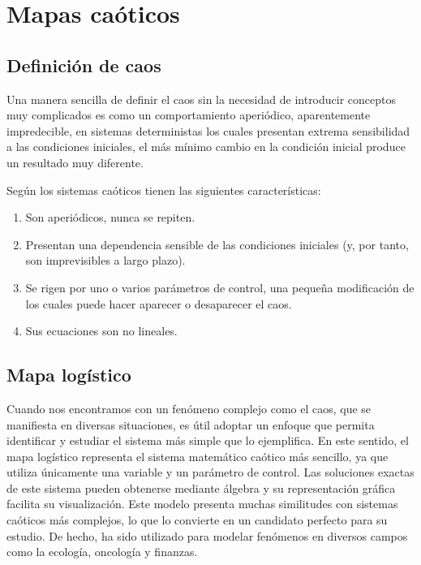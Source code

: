 \chapter{Mapas caóticos}

    \section{Definición de caos}
    
    Una manera sencilla de definir el caos sin la necesidad de introducir conceptos muy complicados es como un comportamiento aperiódico, aparentemente impredecible, en sistemas deterministas los cuales presentan extrema sensibilidad a las condiciones iniciales, el más mínimo cambio en la condición inicial produce un resultado muy diferente. \cite{Strogatz1994}

    Según \cite{Sprott2003} los sistemas caóticos tienen las siguientes características:

    \begin{enumerate}
        \item Son aperiódicos, nunca se repiten.
        \item Presentan una dependencia sensible de las condiciones iniciales (y, por tanto, son imprevisibles a largo plazo).
        \item Se rigen por uno o varios parámetros de control, una pequeña modificación de los cuales puede hacer aparecer o desaparecer el caos.
        \item Sus ecuaciones son no lineales.
    \end{enumerate}

    \section{Mapa logístico}

        Cuando nos encontramos con un fenómeno complejo como el caos, que se manifiesta en diversas situaciones, es útil adoptar un enfoque que permita identificar y estudiar el sistema más simple que lo ejemplifica. En este sentido, el mapa logístico representa el sistema matemático caótico más sencillo, ya que utiliza únicamente una variable y un parámetro de control. Las soluciones exactas de este sistema pueden obtenerse mediante álgebra y su representación gráfica facilita su visualización. Este modelo presenta muchas similitudes con sistemas caóticos más complejos, lo que lo convierte en un candidato perfecto para su estudio. De hecho, ha sido utilizado para modelar fenómenos en diversos campos como la ecología, oncología y finanzas.\cite{Sprott2003}

